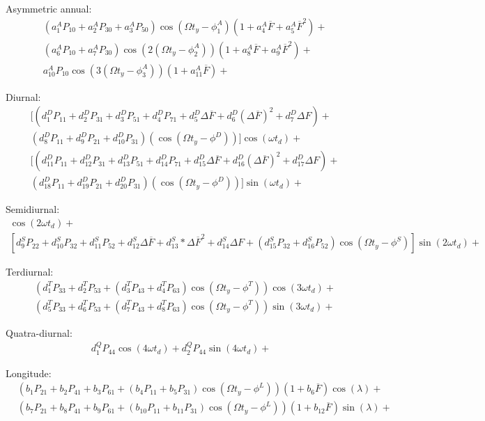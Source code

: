 \documentclass[referee,a4paper,12pt,traditabstract]{swsc}
\begin{document}
\begin{linenumbers}
Asymmetric annual:
\begin{align*}
&(a^A_1P_{10}+a^A_2P_{30}+a^A_3 P_{50})\cos(\Omega t_y-\phi^A_1)(1+a^A_4\overline{F}+a^A_5\overline{F}^2)+\\
&(a^A_6P_{10}+a^A_7P_{30})\cos(2(\Omega t_y-\phi^A_2))(1+a^A_8\overline{F}+a^A_9\overline{F}^2) + \\
&a^A_{10} P_{10}\cos(3(\Omega t_y-\phi^A_3))(1+a^A_{11}\overline{F})+
\end{align*}

Diurnal:
\begin{align*}
&[(d^D_1 P_{11}+d^D_2 P_{31}+d^D_3 P_{51}+d^D_4 P_{71} + d^D_5\Delta\overline{F} + d^D_6(\Delta\overline{F})^2 + d^D_7 \Delta F) + \\
&(d^D_8 P_{11} + d^D_9 P_{21} + d^D_{10} P_{31})(\cos(\Omega t_y-\phi^D))]\cos(\omega t_d)+\\
&[(d^D_{11} P_{11}+d^D_{12} P_{31}+d^D_{13} P_{51}+d^D_{14} P_{71} + d^D_{15}\Delta\overline{F} + d^D_{16}(\Delta\overline{F})^2 + d^D_{17} \Delta F) + \\
&(d^D_{18} P_{11} + d^D_{19} P_{21} + d^D_{20} P_{31})(\cos(\Omega t_y-\phi^D))]\sin(\omega t_d)+
\end{align*}

Semidiurnal:
\begin{align*}
[d^S_1 P_{22} + d^S_2 P_{32} + d^S_3 P_{52} + d^S_4\Delta\overline{F} + d^S_5*\Delta\overline{F}^2 + d^S_6 \Delta F + (d^S_7 P_{32} + d^S_8 P_{52})\cos(\Omega t_y-\phi^S)]\cos(2\omega t_d) +\\
[d^S_9 P_{22} + d^S_{10} P_{32} + d^S_{11} P_{52} + d^S_{12}\Delta\overline{F} + d^S_{13}*\Delta\overline{F}^2 + d^S_{14} \Delta F + (d^S_{15} P_{32} + d^S_{16} P_{52})\cos(\Omega t_y-\phi^S)]\sin(2\omega t_d)+
\end{align*}

Terdiurnal:
\begin{align*}
&(d^T_1P_{33} + d^T_2 P_{53} + (d^T_3 P_{43} + d^T_4P_{63})\cos(\Omega t_y-\phi^T))\cos(3\omega t_d)+\\
&(d^T_5P_{33} + d^T_6 P_{53} + (d^T_7 P_{43} + d^T_8P_{63})\cos(\Omega t_y-\phi^T))\sin(3\omega t_d)+
\end{align*}

Quatra-diurnal:
\begin{align*}
d^Q_1 P_{44}\cos(4 \omega t_d) + d^Q_2 P_{44}\sin(4\omega t_d)+
\end{align*}

Longitude:
\begin{align*}
&(b_1 P_{21}+ b_2 P_{41}+ b_3 P_{61} +(b_4 P_{11}+b_5 P_{31})\cos(\Omega t_y-\phi^L))(1+b_6 \overline{F})\cos(\lambda) + \\
&(b_7 P_{21}+ b_8 P_{41}+ b_9 P_{61} +(b_{10} P_{11}+b_{11} P_{31})\cos(\Omega t_y-\phi^L))(1+b_{12} \overline{F})\sin(\lambda) +
\end{align*}


\end{linenumbers}
\end{document}
